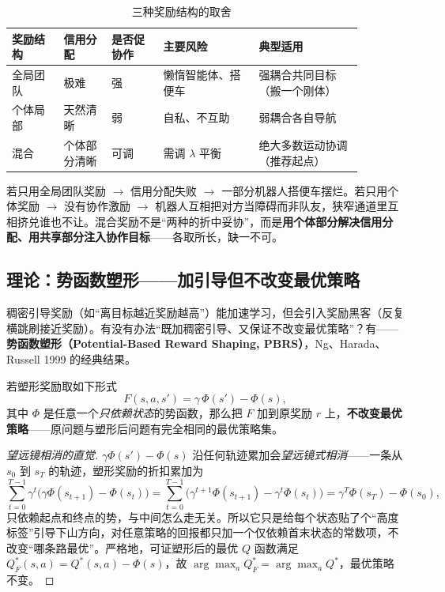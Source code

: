 \begin{table}[H]\centering\small
\caption{三种奖励结构的取舍}
\label{tab:mc-reward}
\begin{tabular}{p{0.13\linewidth}p{0.12\linewidth}p{0.13\linewidth}p{0.24\linewidth}p{0.26\linewidth}}
\toprule
奖励结构 & 信用分配 & 是否促协作 & 主要风险 & 典型适用 \\
\midrule
全局团队 & 极难 & 强 & 懒惰智能体、搭便车 & 强耦合共同目标（搬一个刚体） \\
个体局部 & 天然清晰 & 弱 & 自私、不互助 & 弱耦合各自导航 \\
混合 & 个体部分清晰 & 可调 & 需调 $\lambda$ 平衡 & 绝大多数运动协调（推荐起点） \\
\bottomrule
\end{tabular}
\end{table}

\begin{insight}
若只用全局团队奖励 $\to$ 信用分配失败 $\to$ 一部分机器人搭便车摆烂。若只用个体奖励 $\to$ 没有协作激励 $\to$ 机器人互相把对方当障碍而非队友，狭窄通道里互相挤兑谁也不让。混合奖励不是“两种的折中妥协”，而是\textbf{用个体部分解决信用分配、用共享部分注入协作目标}——各取所长，缺一不可。
\end{insight}

\subsection{理论：势函数塑形——加引导但不改变最优策略}
\label{sec:mc-pbrs}

稠密引导奖励（如“离目标越近奖励越高”）能加速学习，但会引入奖励黑客（反复横跳刷接近奖励）。有没有办法“既加稠密引导、又保证不改变最优策略”？有——\textbf{势函数塑形（Potential-Based Reward Shaping, PBRS）}，Ng、Harada、Russell 1999 的经典结果\cite{ng1999shaping}。

\begin{theorem}\label{thm:mc-pbrs}
若塑形奖励取如下形式
\begin{equation}
  F(s,a,s')=\gamma\,\Phi(s')-\Phi(s),
  \label{eq:mc-pbrs}
\end{equation}
其中 $\Phi$ 是任意一个\emph{只依赖状态}的势函数，那么把 $F$ 加到原奖励 $r$ 上，\textbf{不改变最优策略}——原问题与塑形后问题有完全相同的最优策略集\cite{ng1999shaping}。
\end{theorem}

\begin{proof}[望远镜相消的直觉]
$\gamma\Phi(s')-\Phi(s)$ 沿任何轨迹累加会\emph{望远镜式相消}——一条从 $s_0$ 到 $s_T$ 的轨迹，塑形奖励的折扣累加为
\[
  \sum_{t=0}^{T-1}\gamma^t\big(\gamma\Phi(s_{t+1})-\Phi(s_t)\big)
  =\sum_{t=0}^{T-1}\big(\gamma^{t+1}\Phi(s_{t+1})-\gamma^t\Phi(s_t)\big)
  =\gamma^T\Phi(s_T)-\Phi(s_0),
\]
只依赖起点和终点的势，与中间怎么走无关。所以它只是给每个状态贴了个“高度标签”引导下山方向，对任意策略的回报都只加一个仅依赖首末状态的常数项，不改变“哪条路最优”。严格地，可证塑形后的最优 $Q$ 函数满足 $Q_F^*(s,a)=Q^*(s,a)-\Phi(s)$，故 $\arg\max_a Q_F^*=\arg\max_a Q^*$，最优策略不变\cite{ng1999shaping}。
\end{proof}

